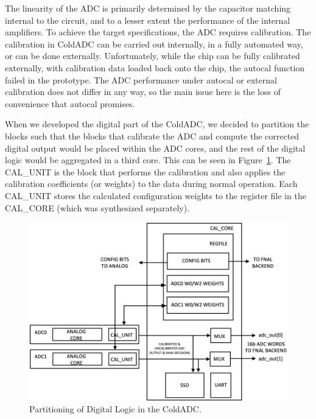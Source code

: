 \label{sec:5.1}


The linearity of the ADC is primarily determined by the capacitor matching internal to the circuit, and to a lesser extent the performance of the internal amplifiers. To achieve the target specifications, the ADC requires calibration. The calibration in ColdADC can be carried out internally, in a fully automated way, or can be done externally. Unfortunately, while the chip can be fully calibrated externally, with calibration data loaded back onto the chip, the autocal function failed in the prototype. The ADC performance under autocal or external calibration does not differ in any way, so the main issue here is the loss of convenience that autocal promises.

When we developed the digital part of the ColdADC, we decided to partition the blocks such that the blocks that calibrate the ADC and compute the corrected digital output would be placed within the ADC cores, and the rest of the digital logic would be aggregated in a third core. This can be seen in Figure~\ref{fig:autocalBlock}. The CAL\_UNIT is the block that performs the calibration and also applies the calibration coefficients (or weights) to the data during normal operation. Each CAL\_UNIT stores the calculated configuration weights to the register file in the CAL\_CORE (which was synthesized separately).
\begin{figure}[h]
\centering
\begin{center}
\includegraphics[width=1.0\textwidth]{figures/autocalBlock.png}
\end{center}
\caption{Partitioning of Digital Logic in the ColdADC.}
\label{fig:autocalBlock}
\end{figure}

